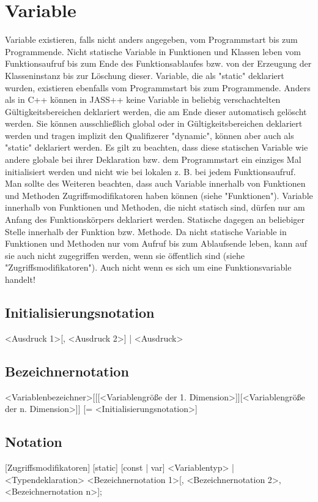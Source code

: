 \chapter{Variable}
Variable existieren, falls nicht anders angegeben, vom Programmstart bis zum Programmende. Nicht statische Variable in Funktionen und
Klassen leben vom Funktionsaufruf bis zum Ende des Funktionsablaufes bzw. von der Erzeugung der Klasseninstanz
bis zur Löschung dieser.
Variable, die als "static" deklariert wurden, existieren ebenfalls vom Programmstart bis zum Programmende.
Anders als in C++ können in JASS++ keine Variable in beliebig verschachtelten Gültigkeitsbereichen deklariert werden, die am Ende dieser
automatisch gelöscht werden.
Sie können ausschließlich global oder in Gültigkeitsbereichen deklariert werden und tragen implizit den Qualifizerer "dynamic",
können aber auch als "static" deklariert werden. Es gilt zu beachten, dass diese statischen Variable wie andere globale
bei ihrer Deklaration bzw. dem Programmstart ein einziges Mal initialisiert werden und nicht wie bei lokalen z. B. bei jedem Funktionsaufruf.
Man sollte des Weiteren beachten, dass auch Variable innerhalb von Funktionen und Methoden Zugriffsmodifikatoren haben können (siehe "Funktionen").
Variable innerhalb von Funktionen und Methoden, die nicht statisch sind, dürfen nur am Anfang des Funktionskörpers deklariert werden.
Statische dagegen an beliebiger Stelle innerhalb der Funktion bzw. Methode.
Da nicht statische Variable in Funktionen und Methoden nur vom Aufruf bis zum Ablaufsende leben, kann auf sie auch nicht zugegriffen werden, wenn sie
öffentlich sind (siehe "Zugriffsmodifikatoren"). Auch nicht wenn es sich um eine Funktionsvariable handelt!

\section{Initialisierungsnotation}
{ <Ausdruck 1>[, <Ausdruck 2>] } | <Ausdruck>

\section{Bezeichnernotation}
<Variablenbezeichner>[[[<Variablengröße der 1. Dimension>]][<Variablengröße der n. Dimension>]] [= <Initialisierungsnotation>]

\section{Notation}
[Zugriffsmodifikatoren] [static] [const | var] <Variablentyp> | <Typendeklaration> <Bezeichnernotation 1>[, <Bezeichnernotation 2>, <Bezeichnernotation n>];

